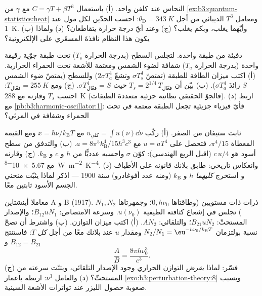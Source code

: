\begin{exercise}[$\star\star$]\label{exo:b3:photons-phonons:8}
النحاس عند كلفن واحد. (أ) باستعمال $C = \gamma T + \beta T^3$ مع
$\gamma$ من \cref{ex:b3:quantum-statistics:heat} ومعامل $T^3$
الديبائي من أجل $\theta_{\text{D}} = \qty{343}{K}$: احسب
الحدّين لكل مول عند \qty{1}{K}. (ب) وأيّهما يغلب، وبكم
يغلب؟ (ج) وعند أيّ درجة حرارة يتقاطعان؟ (د) ولماذا يكون هذا
النظام نافذةَ المسعّري على 
الإلكترونية؟
\end{exercise}

\begin{exercise}[$\star\star$]\label{exo:b3:photons-phonons:9}
دفيئة من طبقة واحدة. لتجلس السطح (بدرجة الحرارة $T_s$)
تحت طبقة جوّية رقيقة واحدة (بدرجة الحرارة $T_a$) شفافة
لضوء الشمس ومعتمة للأشعة تحت الحمراء الحرارية. (أ) اكتب ميزان
الطاقة للطبقة (تمتصّ $\sigma T_s^4$ وتشعّ
$2\sigma T_a^4$) وللسطح (يمتصّ ضوء الشمس $S$ زائدَ
$\sigma T_a^4$). (ب) بيّن أن $T_s = 2^{1/4}\,T_{\text{فعّال}}$ حيث
$\sigma T_{\text{فعّال}}^4 = S$. (ج) ومع $T_{\text{فعّال}} =
\qty{255}{K}$: احسب $T_s$ وقارنه مع \qty{288}{K}
(فالجوّ الحقيقي بطانية جزئية متعددة الطبقات). (د)
اربط مع \cref{pb:b3:harmonic-oscillator:1}: فأيّ فيزياء
جزيئية تجعل الطبقة معتمة في تحت الحمراء وشفافة في
المرئي؟
\end{exercise}

\begin{exercise}[$\star\star\star$]\label{exo:b3:photons-phonons:10}
ثابت ستيفان من الصفر. (أ) ركّب $u_{\text{كلي}} =
\int u(\nu)\dd\nu$ مع $x = h\nu/k_{\text{B}}T$ ومع القيمة المعطاة
$\pi^4/15$، فتحصل على $u = aT^4$ مع $a =
8\pi^5k_{\text{B}}^4/15h^3c^3$. (ب) والتدفق من سطح
أسود هو $c\,u/4$ (اقبل الربع الهندسي): كوّن
$\sigma$ واحسبه عدديًّا من $h$ و $c$ و
$k_{\text{B}}$. (ج) وقارنه مع \qty{5.67e-8}{W.m^{-2}.K^{-4}}.
(د) وانعكاس تاريخي: طابق بلانك قانونه على الأطياف و
استخرج \emph{كليهما} $h$ و $k_{\text{B}}$ (ومنه عدد أفوغادرو) سنة
1900 --- اذكر لماذا يثبّت منحني الجسم الأسود ثابتين معًا.
\end{exercise}

\begin{exercise}[$\star\star\star$]\label{exo:b3:photons-phonons:11}
معاملا أينشتاين A و B (1917). ذرات ذات مستويين (وطاقتاها $0,
h\nu_0$؛ وجمهرتاها $N_1, N_2$) تجلس في إشعاع كثافته
الطيفية $u(\nu_0)$. وسرعة الامتصاص: $B_{12}uN_1$؛ والإصدار
المستحثّ: $B_{21}uN_2$؛ والتلقائي: $AN_2$. (أ) اكتب
ميزان التوازن. (ب) واشترط أن تصحّ نسبة بولتزمان
$N_2/N_1 = \eu^{-h\nu_0/k_{\text{B}}T}$ ومقدار $u$ عند بلانك
معًا من أجل \emph{كل} $T$: فاستنتج $B_{12} = B_{21}$ و
\[
\frac{A}{B} = \frac{8\pi h\nu_0^3}{c^3} .
\]
(ج) فسّر: لماذا \emph{يفرض} التوازن الحراري وجود الإصدار
التلقائي، ويثبّت سرعته من المستحثّ؟ (د) والعامل $\nu^3$: اربطه
بأعمار \cref{exo:b3:perturbation-theory:8} وبسبب صعوبة
حصول الليزر عند تواترات الأشعة السينية.
\end{exercise}

